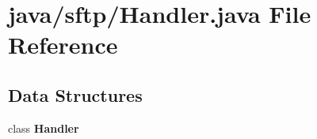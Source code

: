 \section{java/sftp/\-Handler.java File Reference}
\label{Handler_8java}
\subsection*{Data Structures}
\begin{DoxyCompactItemize}
\item 
class {\bf Handler}
\end{DoxyCompactItemize}
